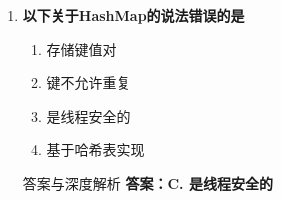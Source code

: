 \documentclass[12pt, a4paper]{ctexart}
\begin{document}
\begin{enumerate}[label=\textbf{\arabic*.}]
\begin{bluebox}{答案与深度解析}
\begin{itemize}[leftmargin=*, nosep, label={}]
\begin{itemize}[label={}, leftmargin=*, nosep]
\begin{lstlisting}[language=Java]
    private transient NavigableMap<E,Object> m;

    public TreeSet() {
        this(new TreeMap<>());
    }
}
				      \end{lstlisting}
				            \item \textbf{有序性}：自然排序或自定义排序（红黑树）
				            \item \textbf{不允许重复}：红黑树的BST特性
				            \item \textbf{代码验证}：
				                  \begin{lstlisting}[language=Java]
TreeSet<String> set = new TreeSet<>();
set.add("C");
set.add("A");
set.add("B");
System.out.println(set); // [A, B, C] 排序不允许重复
				      \end{lstlisting}
			            \end{itemize}
		      \end{itemize}

		      \textbf{【应背诵知识点}
		      \begin{itemize}[label={}, nosep]
			      \item HashSet：无序、不允许重复、基于哈希表
			      \item LinkedHashSet：有序（插入顺序）、不允许重复、哈希表+链表
			      \item TreeSet：有序（排序）、不允许重复、红黑树
			      \item 选项辨析：HashSet=无序唯一，LinkedHashSet=有序唯一，TreeSet=排序唯一
		      \end{itemize}

		      \textbf{【命题趋势与实战策略】}

		      \textbf{考场秒杀}：看到"无序且不允许重复"→选HashSet
	      \end{bluebox}

	      \vspace{1em}

	\item \textbf{以下关于HashMap的说法错误的是}
	      \begin{enumerate}[label=\Alph*.]
		      \item 存储键值对
		      \item 键不允许重复
		      \item 是线程安全的
		      \item 基于哈希表实现
	      \end{enumerate}

	      \begin{bluebox}{答案与深度解析}
		      \textbf{答案：C. 是线程安全的}


\end{bluebox}
\end{enumerate}
\end{document}
